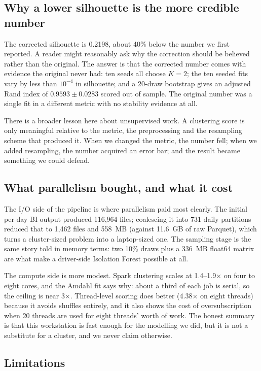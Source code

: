 \documentclass[11pt,a4paper]{article}
\begin{document}
\subsection{Why a lower silhouette is the more credible number}

The corrected silhouette is 0.2198, about 40\% below the number we first reported. A reader might reasonably ask why the correction should be believed rather than the original. The answer is that the corrected number comes with evidence the original never had: ten seeds all choose $K=2$; the ten seeded fits vary by less than $10^{-4}$ in silhouette; and a 20-draw bootstrap gives an adjusted Rand index of $0.9593 \pm 0.0283$ scored out of sample. The original number was a single fit in a different metric with no stability evidence at all.

There is a broader lesson here about unsupervised work. A clustering score is only meaningful relative to the metric, the preprocessing and the resampling scheme that produced it. When we changed the metric, the number fell; when we added resampling, the number acquired an error bar; and the result became something we could defend.

\subsection{What parallelism bought, and what it cost}

The I/O side of the pipeline is where parallelism paid most clearly. The initial per-day BI output produced 116{,}964 files; coalescing it into 731 daily partitions reduced that to 1{,}462 files and 558~MB (against 11.6~GB of raw Parquet), which turns a cluster-sized problem into a laptop-sized one. The sampling stage is the same story told in memory terms: two 10\% draws plus a 336~MB float64 matrix are what make a driver-side Isolation Forest possible at all.

The compute side is more modest. Spark clustering scales at 1.4--1.9$\times$ on four to eight cores, and the Amdahl fit says why: about a third of each job is serial, so the ceiling is near 3$\times$. Thread-level scoring does better (4.38$\times$ on eight threads) because it avoids shuffles entirely, and it also shows the cost of oversubscription when 20 threads are used for eight threads' worth of work. The honest summary is that this workstation is fast enough for the modelling we did, but it is not a substitute for a cluster, and we never claim otherwise.

\subsection{Limitations}
\label{sec:limitations}
\end{document}
